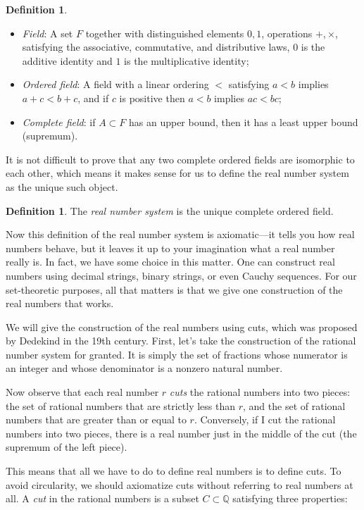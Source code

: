 \documentclass[11pt,oneside,a4paper]{amsbook}
\newcommand{\Q}{\mathbb Q}
\theoremstyle{definition}
\theoremstyle{plain}
\theoremstyle{definition}
\newtheorem{definition}[theorem]{Definition}
\theoremstyle{remark}
\numberwithin{equation}{section}
\numberwithin{figure}{section}
\begin{document}
\begin{definition}
  \begin{itemize}
    \item \emph{Field}: A set $F$ together with distinguished elements $0,1$, operations $+,\times$, satisfying the associative, commutative, and distributive laws, $0$ is the additive identity and $1$ is the multiplicative identity;
    \item \emph{Ordered field}: A field with a linear ordering $<$ satisfying $a<b$ implies $a+c<b+c$, and if $c$ is positive then $a<b$ implies $ac<bc$;
    \item \emph{Complete field}: if $A\subset F$ has an upper bound, then it has a least upper bound (supremum).
  \end{itemize}
\end{definition}

It is not difficult to prove that any two complete ordered fields are isomorphic to each other, which means it makes sense for us to define the real number system as the unique such object.

\begin{definition}
  The \emph{real number system} is the unique complete ordered field.
\end{definition}

Now this definition of the real number system is axiomatic---it tells you how real numbers behave, but it leaves it up to your imagination what a real number really is. In fact, we have some choice in this matter. One can construct real numbers using decimal strings, binary strings, or even Cauchy sequences. For our set-theoretic purposes, all that matters is that we give one construction of the real numbers that works.

We will give the construction of the real numbers using cuts, which was proposed by Dedekind in the 19th century. First, let's take the construction of the rational number system for granted. It is simply the set of fractions whose numerator is an integer and whose denominator is a nonzero natural number.

Now observe that each real number $r$ \emph{cuts} the rational numbers into two pieces: the set of rational numbers that are strictly less than $r$, and the set of rational numbers that are greater than or equal to $r$. Conversely, if I cut the rational numbers into two pieces, there is a real number just in the middle of the cut (the supremum of the left piece).

This means that all we have to do to define real numbers is to define cuts. To avoid circularity, we should axiomatize cuts without referring to real numbers at all. A \emph{cut} in the rational numbers is a subset $C\subset\Q$ satisfying three properties:
\end{document}
